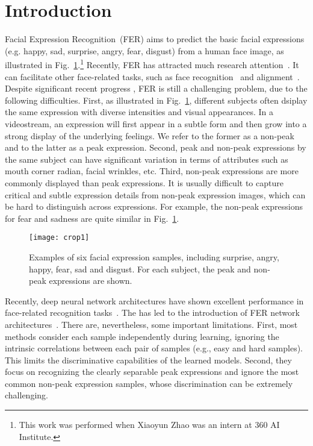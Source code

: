 \documentclass[runningheads]{llncs}
\begin{document}
\section{Introduction}

Facial Expression Recognition~(FER) aims to predict the basic facial 
expressions (e.g. happy, sad, surprise, angry, fear, disgust) from a human 
face image, as illustrated in Fig.~\ref{fig:expression}.\footnote{This work was performed when Xiaoyun Zhao was an intern at 360 AI Institute.}
 Recently, FER has 
attracted much research 
attention~\cite{liu2014learning,chen20153d,dapogny2015pairwise,liu2014facial,yu2015image,liu2013aware,jung2015joint}. It can facilitate other face-related tasks, such as face 
recognition~\cite{li2006expression} and alignment~\cite{zhang2014facial}. 
Despite significant recent progress
\cite{zhong2012learning,shan2009facial,liu2014facial,kahou2014facial}, FER 
is still a challenging problem, due to the following 
difficulties. First, as illustrated 
in Fig.~\ref{fig:expression}, different subjects often dsiplay the same 
expression with diverse intensities and visual appearances. In
a videostream, an expression will first appear in a subtle form 
and then grow into a strong display of the underlying feelings. 
We refer to the former as a non-peak and to the latter as a peak expression. 
Second, peak and non-peak expressions by the same subject can have 
significant variation in terms of attributes such as mouth corner radian, 
facial wrinkles, etc. 
Third, non-peak expressions are more commonly displayed than peak 
expressions. It is usually difficult to capture critical and subtle
expression details from non-peak expression images, which can be hard to 
distinguish across expressions. For example, the non-peak expressions for fear 
and sadness are quite similar in Fig.~\ref{fig:expression}.

\begin{figure}
	\centering
	\texttt{[image: crop1]}
	\caption{Examples of six facial expression samples, including surprise, angry, happy, fear, sad and disgust. For each subject, the peak and non-peak expressions are shown. }
	\label{fig:expression}
\end{figure}



Recently, deep neural network
architectures have shown excellent performance in face-related recognition 
tasks~\cite{chopra2005learning,lai2015deep,li2015convolutional}. The has
led to the introduction of FER network 
architectures~\cite{liu2014facial,mollahosseini2015going}. There are, nevertheless, some important limitations. First,
most methods consider each sample independently during learning,
ignoring the intrinsic correlations between each pair of samples (e.g., easy 
and hard samples). This limits the discriminative capabilities of the learned 
models. Second, they focus on recognizing the clearly separable peak 
expressions and ignore the most common non-peak expression samples, whose
discrimination can be extremely challenging.
\end{document}
